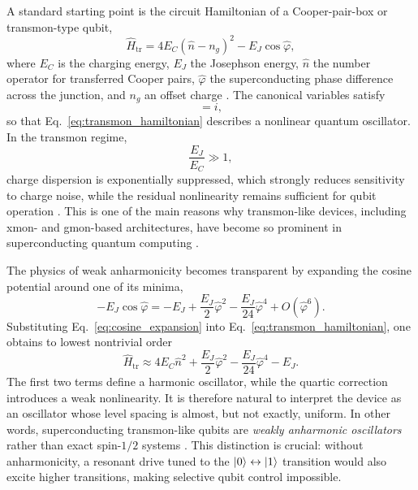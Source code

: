 A standard starting point is the circuit Hamiltonian of a Cooper-pair-box or transmon-type qubit,
\begin{equation}
\hat{H}_{\mathrm{tr}}
=
4E_C (\hat{n}-n_g)^2
-
E_J \cos \hat{\varphi},
\label{eq:transmon_hamiltonian}
\end{equation}
where $E_C$ is the charging energy, $E_J$ the Josephson energy, $\hat{n}$ the number operator for transferred Cooper pairs, $\hat{\varphi}$ the superconducting phase difference across the junction, and $n_g$ an offset charge \cite{Koch2007}. The canonical variables satisfy
\begin{equation}
[\hat{\varphi},\hat{n}] = i,
\label{eq:phase_number_commutator}
\end{equation}
so that Eq.~\eqref{eq:transmon_hamiltonian} describes a nonlinear quantum oscillator. In the transmon regime,
\begin{equation}
\frac{E_J}{E_C} \gg 1,
\label{eq:transmon_regime}
\end{equation}
charge dispersion is exponentially suppressed, which strongly reduces sensitivity to charge noise, while the residual nonlinearity remains sufficient for qubit operation \cite{Koch2007}. This is one of the main reasons why transmon-like devices, including xmon- and gmon-based architectures, have become so prominent in superconducting quantum computing \cite{Krantz2019,Kjaergaard2020,Chen2014}.

The physics of weak anharmonicity becomes transparent by expanding the cosine potential around one of its minima,
\begin{equation}
- E_J \cos \hat{\varphi}
=
- E_J
+
\frac{E_J}{2}\hat{\varphi}^{2}
-
\frac{E_J}{24}\hat{\varphi}^{4}
+
O(\hat{\varphi}^{6}).
\label{eq:cosine_expansion}
\end{equation}
Substituting Eq.~\eqref{eq:cosine_expansion} into Eq.~\eqref{eq:transmon_hamiltonian}, one obtains to lowest nontrivial order
\begin{equation}
\hat{H}_{\mathrm{tr}}
\approx
4E_C \hat{n}^{2}
+
\frac{E_J}{2}\hat{\varphi}^{2}
-
\frac{E_J}{24}\hat{\varphi}^{4}
-
E_J.
\label{eq:transmon_quartic_approximation}
\end{equation}
The first two terms define a harmonic oscillator, while the quartic correction introduces a weak nonlinearity. It is therefore natural to interpret the device as an oscillator whose level spacing is almost, but not exactly, uniform. In other words, superconducting transmon-like qubits are \emph{weakly anharmonic oscillators} rather than exact spin-$1/2$ systems \cite{Koch2007,Krantz2019}. This distinction is crucial: without anharmonicity, a resonant drive tuned to the $\ket{0}\leftrightarrow\ket{1}$ transition would also excite higher transitions, making selective qubit control impossible.

